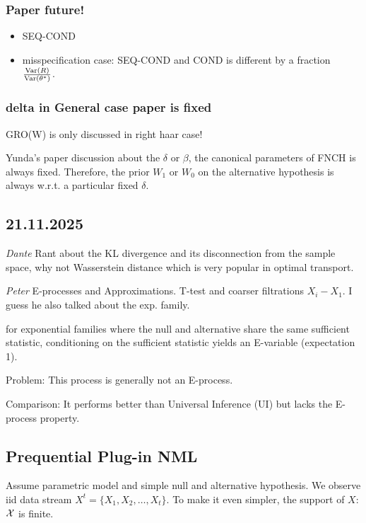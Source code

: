 \subsubsection*{Paper future!}

\begin{itemize}
	\item SEQ-COND
	\item misspecification case: SEQ-COND and COND is different by a fraction $\frac{\mathrm{Var} \left( {R} \right)}{\mathrm{Var} \left( {\theta^*} \right)}$.
\end{itemize}


\subsubsection*{delta in General case paper is fixed}

GRO(W) is only discussed in right haar case!

Yunda's paper discussion about the $\delta$ or $\beta$, the canonical parameters of FNCH is always fixed.
Therefore, the prior $W_1$ or $W_0$ on the alternative hypothesis is always w.r.t. a particular fixed $\delta$.


\subsection*{21.11.2025}

\emph{Dante} Rant about the KL divergence and its disconnection from the sample space, why not Wasserstein distance which is very popular in optimal transport.

\emph{Peter} E-processes and Approximations. T-test and coarser filtrations $X_i-X_1$. I guess he also talked about the exp. family.

for exponential families where the null and alternative share the same sufficient statistic, conditioning on the sufficient statistic yields an E-variable (expectation 1).

Problem: This process is generally not an E-process.

Comparison: It performs better than Universal Inference (UI) but lacks the E-process property.

\subsection*{Prequential Plug-in NML}

Assume parametric model and simple null and alternative hypothesis.
We observe iid data stream $X^t=\{X_1,X_2,\dots,X_t\}$.
To make it even simpler, the support of $X$: $\mathcal{X}$ is finite.

